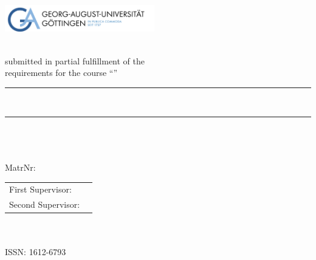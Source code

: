 
\begin{titlepage}
\includegraphics[width=6.5cm]{logo-goettingen.pdf} 
	
\begin{center}
	
	\vspace*{.06\textheight}
	{\LARGE \textbf{\thesistype}\\}
	submitted in partial fulfillment of the\\
	requirements for the course ``\course''\\[0.5cm]
	
	
	\rule{.9\linewidth}{.6pt} \\[0.4cm] %
	{\huge \bfseries \thesistitle}\vspace{0.4cm}
	\rule{.9\linewidth}{.6pt} \\[1.5cm] %
	
	\Large\authorname\\
	\hfill\\
	\large MatrNr: \matrikelnumber\\ \vfill
	\begin{tabular}{@{}ll}
		First Supervisor: &\firstsupervisor\\
		Second Supervisor: &\secondsupervisor
	\end{tabular}
	\vfill
	\university\\
	\department\\
	ISSN: 1612-6793
	\vfill
	{\large \submissiondate}\\[4cm] %
	
	\vfill
\end{center}

\newpage
\vfill




\end{titlepage}